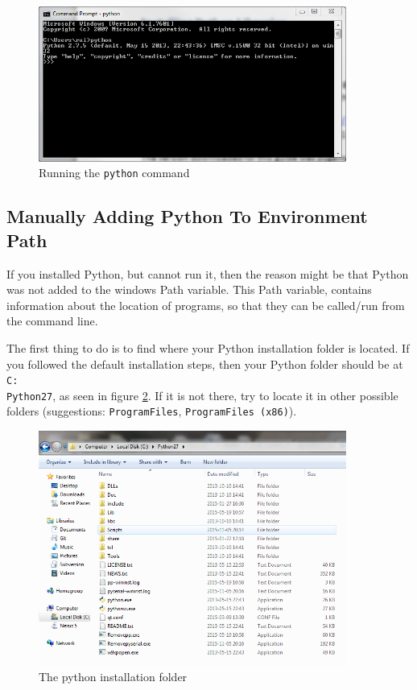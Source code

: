 \begin{figure}[h!]
  \centering
    \includegraphics[width=0.9\textwidth]{python_install_terminal_python_command}
    \caption{Running the \texttt{python} command \label{fig:python_install_python_command} }
\end{figure}

\subsection{Manually Adding Python To Environment Path}
\label{subsec:adding_python_to_environment_path}

If you installed Python, but cannot run it, then the reason might be that Python was not added to the windows Path variable. This Path variable, contains information about the location of programs, so that they can be called/run from the command line.

The first thing to do is to find where your Python installation folder is located. If you followed the default installation steps, then your Python folder should be at \texttt{C:\\Python27}, as seen in figure \ref{fig:python_install_python_folder}. If it is not there, try to locate it in other possible folders (suggestions: \texttt{ProgramFiles}, \texttt{ProgramFiles (x86)}).

\begin{figure}[h!]
  \centering
    \includegraphics[width=0.9\textwidth]{python_install_python_folder}
    \caption{The python installation folder \label{fig:python_install_python_folder} }
\end{figure}

